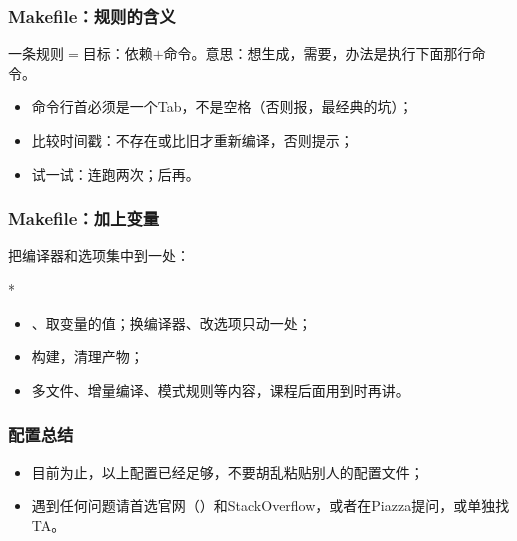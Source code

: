 \begin{frame}
    \frametitle{Makefile：规则的含义}
    一条规则$=$\alert{目标}：\alert{依赖}$+$\alert{命令}。意思：想生成，需要，办法是执行下面那行命令。

    \begin{itemize}
        \item \alert{命令行首必须是一个Tab}，不是空格（否则报，最经典的坑）；
        \item {}比较时间戳：不存在或比旧才重新编译，否则提示；
        \item 试一试：连跑两次；后再。
    \end{itemize}
\end{frame}

\begin{frame}
    \frametitle{Makefile：加上变量}
    把编译器和选项集中到一处：
    \begin{Code}*
        
    \end{Code}

    \begin{itemize}
        \item {}、取变量的值；换编译器、改选项只动一处；
        \item {}构建，清理产物；
        \item 多文件、增量编译、模式规则等内容，课程后面用到时再讲。
    \end{itemize}
\end{frame}

\begin{frame}
    \frametitle{配置总结}
    \begin{itemize}
        \item 目前为止，以上配置已经足够，不要胡乱粘贴别人的配置文件；
        \item 遇到任何问题请首选官网（）和StackOverflow，或者在Piazza提问，或单独找TA。
    \end{itemize}
\end{frame}
